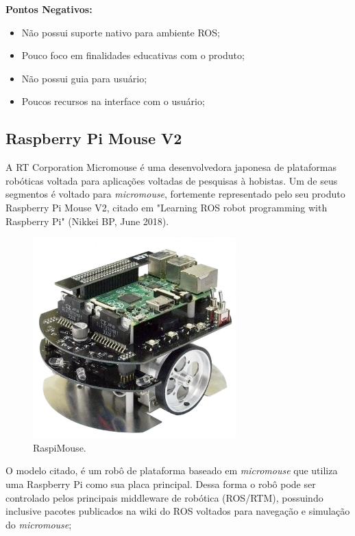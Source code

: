 \textbf{Pontos Negativos:}
\begin{itemize}
	\item Não possui suporte nativo para ambiente ROS;
	\item Pouco foco em finalidades educativas com o produto;
	\item Não possui guia para usuário;
	\item Poucos recursos na interface com o usuário;
\end{itemize}

\subsection{Raspberry Pi Mouse V2}
\hspace{0.5cm}  A RT Corporation Micromouse é uma desenvolvedora japonesa de plataformas robóticas voltada para aplicações  voltadas de pesquisas à hobistas. Um de seus segmentos é voltado para \textit{micromouse}, fortemente representado pelo seu produto Raspberry Pi Mouse V2, citado em "Learning ROS robot programming with Raspberry Pi" (Nikkei BP, June 2018).

\begin{figure}[H]
	\centering
	\includegraphics[width=0.7\textwidth]
	{Figures/RaspiMouse_model.png}
	\caption{\label{fig:RaspiMouse_model} RaspiMouse.}
\end{figure}
 O modelo citado, é um robô de plataforma baseado em \textit{micromouse} que utiliza uma Raspberry Pi como sua placa principal. Dessa forma o robô pode ser controlado pelos principais middleware de robótica (ROS/RTM), possuindo inclusive pacotes publicados na wiki do ROS voltados para navegação e simulação do \textit{micromouse};

